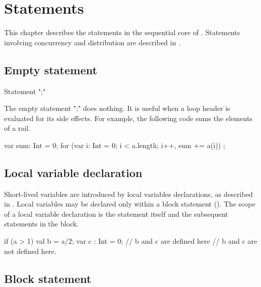 \chapter{Statements}\label{XtenStatements}

This chapter describes the statements in the sequential core of
\Xten{}.  Statements involving concurrency and distribution
are described in .

\section{Empty statement}

\begin{grammar}
Statement \: \xcd";" \\
\end{grammar}

The empty statement \xcd";" does nothing.  It is useful when a
loop header is evaluated for its side effects.  For example,
the following code sums the elements of a rail.

\begin{xten}
var sum: Int = 0;
for (var i: Int = 0; i < a.length; i++, sum += a(i))
    ;
\end{xten}

\section{Local variable declaration}

Short-lived variables are introduced by local variables declarations, as
described in . Local variables may be declared only
within a block statement (). The scope of a local variable
declaration is the statement itself and the subsequent statements in the
block.
\begin{xten}
  if (a > 1) {
     val b = a/2;
     var c : Int = 0;
     // b and c are defined here
  }
  // b and c are not defined here.
\end{xten}


\section{Block statement}
\label{Blocks}

